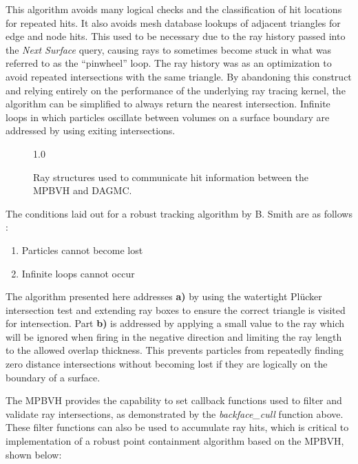 This algorithm avoids many logical checks and the classification of hit
locations for repeated hits. It also avoids mesh database lookups of adjacent
triangles for edge and node hits. This used to be necessary due to the ray
history passed into the \textit{Next Surface} query, causing rays to sometimes
become stuck in what was referred to as the ``pinwheel'' loop. The ray history
was as an optimization to avoid repeated intersections with the same
triangle. By abandoning this construct and relying entirely on the performance
of the underlying ray tracing kernel, the algorithm can be simplified to always
return the nearest intersection. Infinite loops in which particles oscillate
between volumes on a surface boundary are addressed by using exiting
intersections.

\begin{figure}[H]
  \centering
  {1.0\textwidth}
  \caption{Ray structures used to communicate hit information between the MPBVH and DAGMC.}
  \label{fig:mpbvh_ray_structures}  
\end{figure}

The conditions laid out for a robust tracking
algorithm by B. Smith are as follows \cite{Smith_2011}:

\begin{enumerate}[a]
  \item Particles cannot become lost
  \item Infinite loops cannot occur
\end{enumerate}

The algorithm presented here addresses \textbf{a)} by using the watertight Pl\"{u}cker
intersection test and extending ray boxes to ensure the correct triangle is
visited for intersection. Part \textbf{b)} is addressed by applying a small
value to the ray which will be ignored when firing in the negative direction and limiting the
ray length to the allowed overlap thickness. This prevents particles from
repeatedly finding zero distance intersections without becoming lost if they are
logically on the boundary of a surface.

The MPBVH provides the capability to set callback functions used to filter and
validate ray intersections, as demonstrated by the \textit{backface\_cull}
function above. These filter functions can also be used to accumulate ray hits,
which is critical to implementation of a robust point containment algorithm
based on the MPBVH, shown below:

